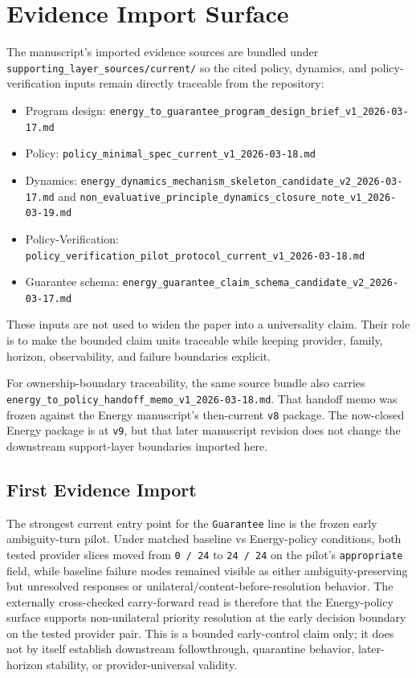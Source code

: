 \documentclass[11pt]{article}
\begin{document}
\section{Evidence Import Surface}

The manuscript's imported evidence sources are bundled under
\texttt{supporting\_layer\_sources/current/} so the cited policy, dynamics,
and policy-verification inputs remain directly traceable from the repository:

\begin{itemize}
\item Program design:
  \texttt{energy\_to\_guarantee\_program\_design\_brief\_v1\_2026-03-17.md}
\item Policy:
  \texttt{policy\_minimal\_spec\_current\_v1\_2026-03-18.md}
\item Dynamics:
  \texttt{energy\_dynamics\_mechanism\_skeleton\_candidate\_v2\_2026-03-17.md}
  and
  \texttt{non\_evaluative\_principle\_dynamics\_closure\_note\_v1\_2026-03-19.md}
\item Policy-Verification:
  \texttt{policy\_verification\_pilot\_protocol\_current\_v1\_2026-03-18.md}
\item Guarantee schema:
  \texttt{energy\_guarantee\_claim\_schema\_candidate\_v2\_2026-03-17.md}
\end{itemize}

These inputs are not used to widen the paper into a universality claim. Their
role is to make the bounded claim units traceable while keeping provider,
family, horizon, observability, and failure boundaries explicit.

For ownership-boundary traceability, the same source bundle also carries
\texttt{energy\_to\_policy\_handoff\_memo\_v1\_2026-03-18.md}. That handoff memo
was frozen against the Energy manuscript's then-current \texttt{v8} package.
The now-closed Energy package is at \texttt{v9}, but that later manuscript
revision does not change the downstream support-layer boundaries imported here.

\subsection{First Evidence Import}

The strongest current entry point for the \texttt{Guarantee} line is the frozen
early ambiguity-turn pilot. Under matched baseline vs Energy-policy conditions,
both tested provider slices moved from \texttt{0 / 24} to \texttt{24 / 24} on the
pilot's \texttt{appropriate} field, while baseline failure modes remained visible
as either ambiguity-preserving but unresolved responses or
unilateral/content-before-resolution behavior. The externally cross-checked
carry-forward read is therefore that the Energy-policy surface supports
non-unilateral priority resolution at the early decision boundary on the tested
provider pair. This is a bounded early-control claim only; it does not by itself
establish downstream followthrough, quarantine behavior, later-horizon stability,
or provider-universal validity.
\end{document}
